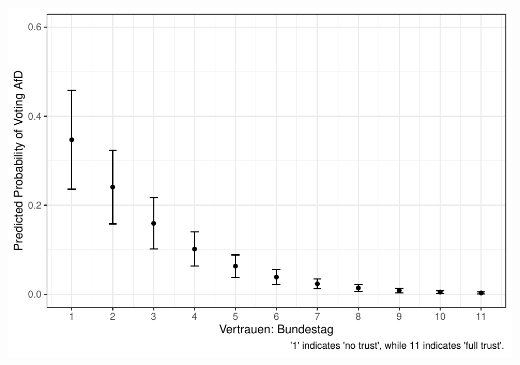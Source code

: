 \documentclass[
]{article}
\begin{document}
\includegraphics{AVCD_Final_Assignment-Edenhofer_latest_files/figure-latex/afd-trust-parliament-1.pdf}
\end{document}
